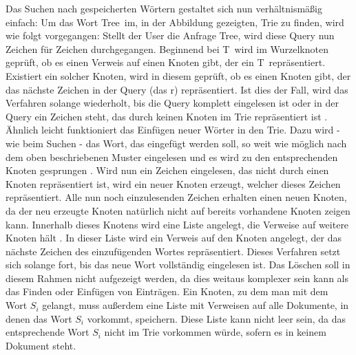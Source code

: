 Das Suchen nach gespeicherten Wörtern gestaltet sich nun verhältnismäßig einfach: Um das Wort \glqq Tree\grqq\ im, in der Abbildung gezeigten, Trie zu finden, wird wie folgt vorgegangen:
\newline 
Stellt der User die Anfrage \glqq Tree\grqq, wird diese Query nun Zeichen für Zeichen durchgegangen. Beginnend bei \glqq T\grqq\ wird im Wurzelknoten geprüft, ob es einen Verweis auf einen Knoten gibt, der ein \glqq T\grqq\ repräsentiert. Existiert ein solcher Knoten, wird in diesem geprüft, ob es einen Knoten gibt, der das nächste Zeichen in der Query (das \glqq r\grqq) repräsentiert. Ist dies der Fall, wird das Verfahren solange wiederholt, bis die Query komplett eingelesen ist oder in der Query ein Zeichen steht, das durch keinen Knoten im Trie repräsentiert ist \cite{trie_Abb} \cite{Trie_Blog}.
\newline \newline
Ähnlich leicht funktioniert das Einfügen neuer Wörter in den Trie. Dazu wird - wie beim Suchen - das Wort, das eingefügt werden soll, so weit wie möglich nach dem oben beschriebenen Muster eingelesen und es wird zu den entsprechenden Knoten gesprungen \cite{Trie_Blog}. Wird nun ein Zeichen eingelesen, das nicht durch einen Knoten repräsentiert ist, wird ein neuer Knoten erzeugt, welcher dieses Zeichen repräsentiert. Alle nun noch einzulesenden Zeichen erhalten einen neuen Knoten, da der neu erzeugte Knoten natürlich nicht auf bereits vorhandene Knoten zeigen kann. Innerhalb dieses Knotens wird eine Liste angelegt, die Verweise auf weitere Knoten hält \cite{trie_Abb}. In dieser Liste wird ein Verweis auf den Knoten angelegt, der das nächste Zeichen des einzufügenden Wortes repräsentiert. Dieses Verfahren setzt sich solange fort, bis das neue Wort vollständig eingelesen ist.
\newline \newline
Das Löschen soll in diesem Rahmen nicht aufgezeigt werden, da dies weitaus komplexer sein kann als das Finden oder Einfügen von Einträgen.
\newline \newline
Ein Knoten, zu dem man mit dem Wort $S_i$ gelangt, muss außerdem eine Liste mit Verweisen auf alle Dokumente, in denen das Wort $S_i$ vorkommt, speichern. Diese Liste kann nicht leer sein, da das entsprechende Wort $S_i$ nicht im Trie vorkommen würde, sofern es in keinem Dokument steht.

